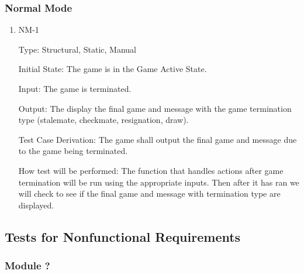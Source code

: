 \documentclass[12pt, titlepage]{article}
\begin{document}
  \subsubsection{Normal Mode}

  \begin{enumerate}

    \item{NM-1\\}

    Type: Structural, Static, Manual
                        
    Initial State: The game is in the Game Active State.
                        
    Input: The game is terminated.
                        
    Output: The display the final game and message with the game termination type (stalemate,
    checkmate, resignation, draw).
                        
    Test Case Derivation: The game shall output the final game and message due to the game being terminated.
    
    How test will be performed: The function that handles actions after game termination will be run using the appropriate inputs.
    Then after it has ran we will check to see if the final game and message with termination type are displayed.  

  \end{enumerate}

\subsection{Tests for Nonfunctional Requirements}



\subsubsection{Module ?}
		
\end{document}
